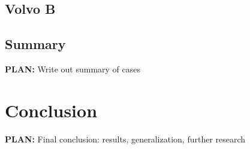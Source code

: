 \documentclass{tut-thesis}
\begin{document}
\section{Volvo B}

\section{Summary}
\textbf{PLAN:} Write out summary of cases

\chapter{Conclusion}
\textbf{PLAN:} Final conclusion: results, generalization, further research

\begingroup
\let\itshape\upshape
\printbibliography{}
\endgroup
\end{document}
